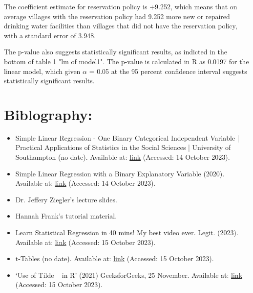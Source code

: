 \documentclass[12pt,letterpaper]{article}
\begin{document}
\begin{enumerate}
	The coefficient estimate for reservation policy is +9.252, which means that on average  villages with the reservation policy had 9.252 more new or repaired drinking water facilities than villages that did not have the reservation policy, with a standard error of 3.948. 
	
	The p-value also suggests statistically significant results, as indicted in the bottom of table 1 "lm of model1". The p-value is calculated in R as 0.0197 for the linear model, which given $\alpha$ = 0.05 at the 95 percent confidence interval suggests statistically significant results. 
	
	\section*{Biblography:}
	\begin{itemize}
		\item Simple Linear Regression - One Binary Categorical Independent Variable | Practical Applications of Statistics in the Social Sciences | University of Southampton (no date). Available at: \href{https://www.southampton.ac.uk/passs/confidence_in_the_police/multivariate_analysis/linear_regression.page}{link} (Accessed: 14 October 2023).
		
		\item Simple Linear Regression with a Binary Explanatory Variable (2020). Available at: \href{https://www.youtube.com/watch?v=53lhpwa3rwY}{link} (Accessed: 14 October 2023).
		\item Dr. Jeffery Ziegler's lecture slides.
		\item Hannah Frank's tutorial material.
		\item Learn Statistical Regression in 40 mins! My best video ever. Legit. (2023). Available at: \href{https://www.youtube.com/watch?v=eYTumjgE2IY}{link} (Accessed: 15 October 2023).
		\item t-Tables (no date). Available at: \href{https://faculty.washington.edu/heagerty/Books/Biostatistics/TABLES/t-Tables/}{link} (Accessed: 15 October 2023).
		\item ‘Use of Tilde ~ in R’ (2021) GeeksforGeeks, 25 November. Available at: \href{https://www.geeksforgeeks.org/use-of-tilde-in-r/}{link} (Accessed: 15 October 2023).
		
		
		
		
		
	\end{itemize}

		
\end{enumerate}
\end{document}

